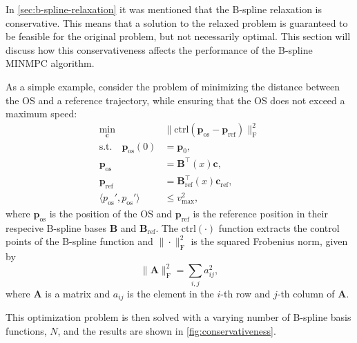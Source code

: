 \label{sec:conservativeness}
In \cref{sec:b-spline-relaxation} it was mentioned that the B-spline relaxation is conservative. This means that a solution to the relaxed problem is guaranteed to be feasible for the original problem, but not necessarily optimal. This section will discuss how this conservativeness affects the performance of the B-spline MINMPC algorithm.

As a simple example, consider the problem of minimizing the distance between the OS and a reference trajectory, while ensuring that the OS does not exceed a maximum speed:
\begin{equation}\label{eq:conservativeness-optimization}
    \begin{aligned}
        \min_{\mathbf c} \quad & \|\text{ctrl}(\mathbf p_\text{os} - \mathbf p_\text{ref})\|_\text{F}^2 \\
        \text{s.t.} \quad \mathbf p_\text{os}(0) &= \mathbf p_0, \\
                     \mathbf p_\text{os} &= \mathbf B^\top(x) \mathbf c, \\
                     \mathbf p_\text{ref} &= \mathbf B_\text{ref}^\top(x) \mathbf c_\text{ref}, \\
                     \langle p_\text{os}', p_\text{os}' \rangle &\le v_\text{max}^2,
    \end{aligned}
\end{equation}
where $\mathbf p_\text{os}$ is the position of the OS and $\mathbf p_\text{ref}$ is the reference position in their respecive B-spline bases $\mathbf B$ and $\mathbf B_\text{ref}$. The $\text{ctrl}(\cdot)$ function extracts the control points of the B-spline function and $\|\cdot\|_\text{F}^2$ is the squared Frobenius norm, given by
\begin{equation}
    \|\mathbf A\|_\text{F}^2 = \sum_{i,j} a_{ij}^2,
\end{equation}
where $\mathbf A$ is a matrix and $a_{ij}$ is the element in the $i$-th row and $j$-th column of $\mathbf A$. 
 
This optimization problem is then solved with a varying number of B-spline basis functions, $N$, and the results are shown in \cref{fig:conservativeness}. 

